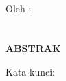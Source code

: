 \clearpage
{}
{}
\begin{center}
    \textbf{\large{\judulid}}\\[0.5cm]
    Oleh :\\
    \penulis\\
    \nim\\[2em]
    \textbf{ABSTRAK}\\[0.5cm]
\end{center}

\noindent Kata kunci: \katakunci